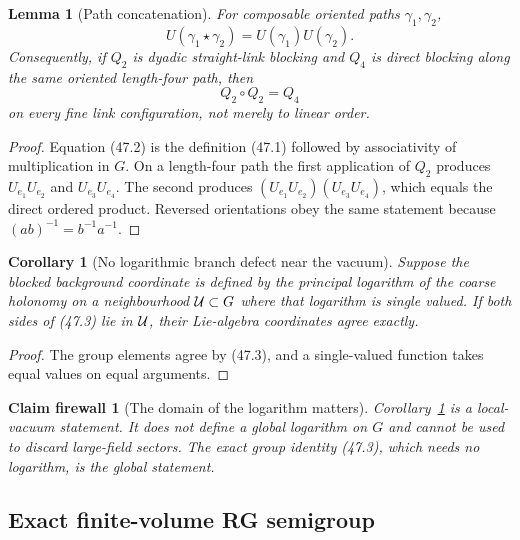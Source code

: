 \documentclass[11pt,oneside]{book}
\newtheorem{lemma}[theorem]{Lemma}
\newtheorem{corollary}[theorem]{Corollary}
\newtheorem{firewall}[theorem]{Claim firewall}
\theoremstyle{definition}
\theoremstyle{remark}
\begin{document}
\begin{lemma}[Path concatenation]
\label{lem:e8v47-path-concat}
For composable oriented paths \(\gamma_1,\gamma_2\),
\[
 U(\gamma_1\star\gamma_2)=U(\gamma_1)U(\gamma_2).              \tag{47.2}
\]
Consequently, if \(Q_2\) is dyadic straight-link blocking and
\(Q_4\) is direct blocking along the same oriented length-four
path, then
\[
 \boxed{Q_2\circ Q_2=Q_4}                                    \tag{47.3}
\]
on every fine link configuration, not merely to linear order.
\end{lemma}

\begin{proof}
Equation (47.2) is the definition (47.1) followed by associativity
of multiplication in \(G\).  On a length-four path the first
application of \(Q_2\) produces
\(U_{e_1}U_{e_2}\) and \(U_{e_3}U_{e_4}\).  The second produces
\((U_{e_1}U_{e_2})(U_{e_3}U_{e_4})\), which equals the direct
ordered product.  Reversed orientations obey the same statement
because \((ab)^{-1}=b^{-1}a^{-1}\).
\end{proof}

\begin{corollary}[No logarithmic branch defect near the vacuum]
\label{cor:e8v47-no-log-defect}
Suppose the blocked background coordinate is defined by the
principal logarithm of the coarse holonomy on a neighbourhood
\({\cal U}\subset G\) where that logarithm is single valued.  If
both sides of (47.3) lie in \({\cal U}\), their Lie-algebra
coordinates agree exactly.
\end{corollary}

\begin{proof}
The group elements agree by (47.3), and a single-valued function
takes equal values on equal arguments.
\end{proof}

\begin{firewall}[The domain of the logarithm matters]
\label{fire:e8v47-log-domain}
Corollary~\ref{cor:e8v47-no-log-defect} is a local-vacuum statement.
It does not define a global logarithm on \(G\) and cannot be used to
discard large-field sectors.  The exact group identity (47.3),
which needs no logarithm, is the global statement.
\end{firewall}

\subsection{Exact finite-volume RG semigroup}
\end{document}
